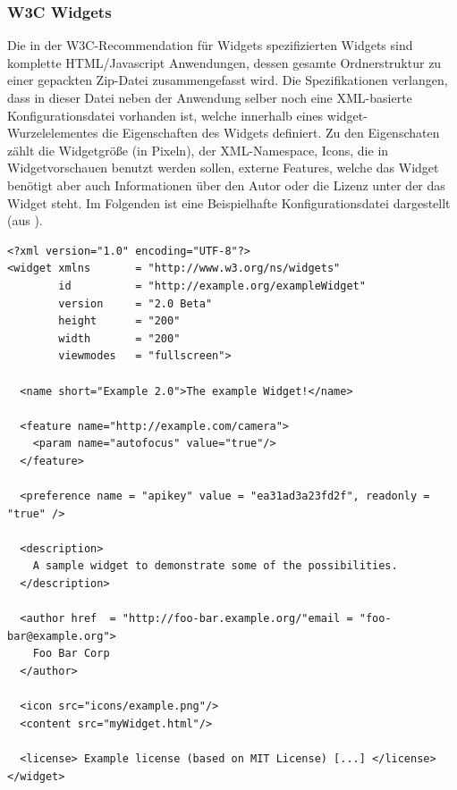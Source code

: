 \subsubsection{W3C Widgets}\label{section:w3c_widgets}
Die in der W3C-Recommendation für Widgets \cite{widgets_w3c} spezifizierten Widgets sind komplette HTML/Javascript Anwendungen, dessen gesamte Ordnerstruktur zu einer gepackten Zip-Datei zusammengefasst wird. Die Spezifikationen verlangen, dass in dieser Datei neben der Anwendung selber noch eine XML-basierte Konfigurationsdatei vorhanden ist, welche innerhalb eines widget-Wurzelelementes die Eigenschaften des Widgets definiert. Zu den Eigenschaten zählt die Widgetgröße (in Pixeln), der XML-Namespace, Icons, die in Widgetvorschauen benutzt werden sollen, externe Features, welche das Widget benötigt aber auch Informationen über den Autor oder die Lizenz unter der das Widget steht. Im Folgenden ist eine Beispielhafte Konfigurationsdatei dargestellt (aus \cite{widgets_w3c}).
\begin{lstlisting}
<?xml version="1.0" encoding="UTF-8"?>
<widget xmlns       = "http://www.w3.org/ns/widgets"
        id          = "http://example.org/exampleWidget"
        version     = "2.0 Beta"
        height      = "200"
        width       = "200"
        viewmodes   = "fullscreen">
 
  <name short="Example 2.0">The example Widget!</name>

  <feature name="http://example.com/camera">
    <param name="autofocus" value="true"/>
  </feature>

  <preference name = "apikey" value = "ea31ad3a23fd2f", readonly = "true" />

  <description>
    A sample widget to demonstrate some of the possibilities.
  </description>

  <author href  = "http://foo-bar.example.org/"email = "foo-bar@example.org">
    Foo Bar Corp
  </author>

  <icon src="icons/example.png"/>
  <content src="myWidget.html"/>
  
  <license> Example license (based on MIT License) [...] </license>
</widget>
\end{lstlisting}

